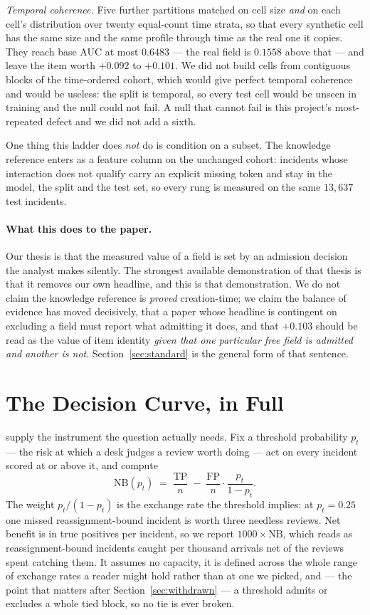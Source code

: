\documentclass[preprint,12pt]{elsarticle}
\begin{document}
\emph{Temporal coherence.} Five further partitions matched on cell size
\emph{and} on each cell's distribution over twenty equal-count time strata,
so that every synthetic cell has the same size and the same profile through
time as the real one it copies. They reach base AUC at most $0.6483$ --- the
real field is $0.1558$ above that --- and leave the item worth $+0.092$ to
$+0.101$. We did not build cells from contiguous blocks of the time-ordered
cohort, which would give perfect temporal coherence and would be useless: the
split is temporal, so every test cell would be unseen in training and the null
could not fail. A null that cannot fail is this project's most-repeated defect
and we did not add a sixth.

One thing this ladder does \emph{not} do is condition on a subset. The
knowledge reference enters as a feature column on the unchanged cohort:
incidents whose interaction does not qualify carry an explicit missing token
and stay in the model, the split and the test set, so every rung is measured
on the same $13{,}637$ test incidents.

\paragraph{What this does to the paper.}
Our thesis is that the measured value of a field is set by an admission
decision the analyst makes silently. The strongest available demonstration of
that thesis is that it removes our own headline, and this is that
demonstration. We do not claim the knowledge reference is \emph{proved}
creation-time; we claim the balance of evidence has moved decisively, that a
paper whose headline is contingent on excluding a field must report what
admitting it does, and that $+0.103$ should be read as the value of item
identity \emph{given that one particular free field is admitted and another is
not}. Section~\ref{sec:standard} is the general form of that sentence.

\section{The Decision Curve, in Full}
\label{app:dca}

\label{sec:dca}


\citet{vickers2006dca} supply the instrument the question actually needs.
Fix a threshold probability $p_t$ --- the risk at which a desk judges a
review worth doing --- act on every incident scored at or above it, and
compute
\[
\text{NB}(p_t) \;=\; \frac{\text{TP}}{n} \;-\; \frac{\text{FP}}{n}
\cdot \frac{p_t}{1-p_t}.
\]
The weight $p_t/(1-p_t)$ is the exchange rate the threshold implies: at
$p_t=0.25$ one missed reassignment-bound incident is worth three needless
reviews. Net benefit is in true positives per incident, so we report
$1000 \times \text{NB}$, which reads as reassignment-bound incidents caught
per thousand arrivals net of the reviews spent catching them. It assumes no
capacity, it is defined across the whole range of exchange rates a reader
might hold rather than at one we picked, and --- the point that matters
after Section~\ref{sec:withdrawn} --- a threshold admits or excludes a whole
tied block, so no tie is ever broken.
\end{document}
